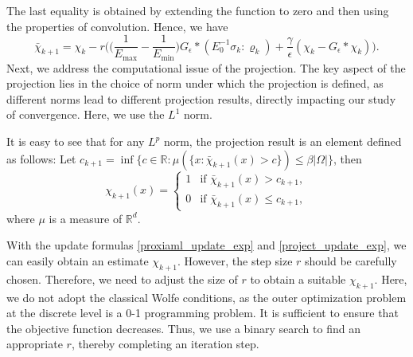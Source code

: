 \documentclass{amsart}
\begin{document}
The last equality is obtained by extending the function to zero and then using the properties of convolution. Hence, we have
\begin{equation}\label{proxiaml_update_exp}
    \bar\chi_{k+1}=\chi_k - r\Big( \Big(\dfrac{1}{E_{\max}}-\dfrac{1}{E_{\min}}\Big)G_\epsilon*(E_0^{-1}\sigma_k:\varrho_k) +\dfrac{\gamma}{\epsilon}(\chi_k-G_\epsilon*\chi_k)\Big).
\end{equation}
Next, we address the computational issue of the projection. The key aspect of the projection lies in the choice of norm under which the projection is defined, as different norms lead to different projection results, directly impacting our study of convergence. Here, we use the \( L^1 \) norm.

It is easy to see that for any \( L^p \) norm, the projection result is an element defined as follows: Let \( c_{k+1} = \inf \{ c \in \mathbb{R} : \mu(\{ x : \bar{\chi}_{k+1}(x) > c \}) \leq \beta |\Omega| \} \), then
\begin{equation}\label{project_update_exp}
    \chi_{k+1}(x) =
    \begin{cases} 
    1 & \text{if } \bar{\chi}_{k+1}(x) > c_{k+1}, \\
    0 & \text{if } \bar{\chi}_{k+1}(x) \leq c_{k+1},
    \end{cases}
\end{equation}
where \(\mu\) is a measure of \(\mathbb{R}^d\).

With the update formulas \eqref{proxiaml_update_exp} and \eqref{project_update_exp}, we can easily obtain an estimate \(\chi_{k+1}\). However, the step size \( r \) should be carefully chosen. Therefore, we need to adjust the size of \( r \) to obtain a suitable \(\chi_{k+1}\). Here, we do not adopt the classical Wolfe conditions, as the outer optimization problem at the discrete level is a 0-1 programming problem. It is sufficient to ensure that the objective function decreases. Thus, we use a binary search to find an appropriate \( r \), thereby completing an iteration step.
\end{document}
